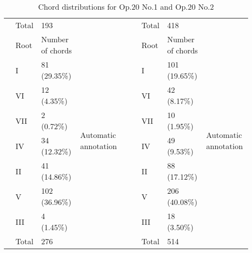\begin{table}[]
{\begin{tabular}{|l|l|l|l|l|l|l|l|l|}
 & Total & 193 &  &  &  & Total & 418 &  \\ \cline{2-4} \cline{7-9}
 & Root & Number of chords & \multirow{9}{*}{Automatic annotation} &  &  & Root & Number of chords & \multirow{9}{*}{Automatic annotation} \\ \cline{2-3} \cline{7-8}
 & I & 81 (29.35\%) &  &  &  & I & 101 (19.65\%) &  \\ \cline{2-3} \cline{7-8}
 & VI & 12 (4.35\%) &  &  &  & VI & 42 (8.17\%) &  \\ \cline{2-3} \cline{7-8}
 & VII & 2 (0.72\%) &  &  &  & VII & 10 (1.95\%) &  \\ \cline{2-3} \cline{7-8}
 & IV & 34 (12.32\%) &  &  &  & IV & 49 (9.53\%) &  \\ \cline{2-3} \cline{7-8}
 & II & 41 (14.86\%) &  &  &  & II & 88 (17.12\%) &  \\ \cline{2-3} \cline{7-8}
 & V & 102 (36.96\%) &  &  &  & V & 206 (40.08\%) &  \\ \cline{2-3} \cline{7-8}
 & III & 4 (1.45\%) &  &  &  & III & 18 (3.50\%) &  \\ \cline{2-3} \cline{7-8}
 & Total & 276 &  &  &  & Total & 514 &  \\ \cline{1-4} \cline{6-9}
\end{tabular}
}
\caption{Chord distributions for Op.20 No.1 and Op.20 No.2}
\label{table:chord_distribs1}
\end{table}


